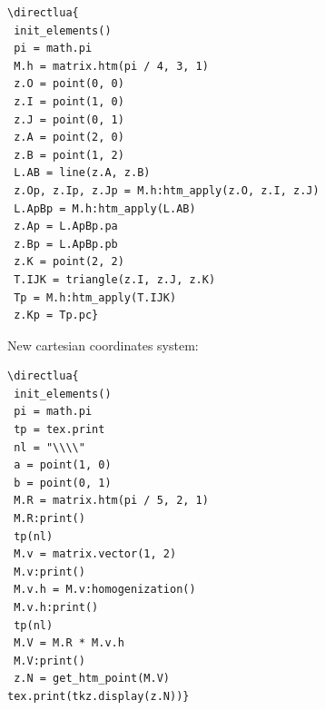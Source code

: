 \begin{minipage}{.6\textwidth}
\begin{verbatim}
\directlua{
 init_elements()
 pi = math.pi
 M.h = matrix.htm(pi / 4, 3, 1)
 z.O = point(0, 0)
 z.I = point(1, 0)
 z.J = point(0, 1)
 z.A = point(2, 0)
 z.B = point(1, 2)
 L.AB = line(z.A, z.B)
 z.Op, z.Ip, z.Jp = M.h:htm_apply(z.O, z.I, z.J)
 L.ApBp = M.h:htm_apply(L.AB)
 z.Ap = L.ApBp.pa
 z.Bp = L.ApBp.pb
 z.K = point(2, 2)
 T.IJK = triangle(z.I, z.J, z.K)
 Tp = M.h:htm_apply(T.IJK)
 z.Kp = Tp.pc}
\end{verbatim}
\end{minipage}
\begin{minipage}{.4\textwidth}
\end{minipage}

\vspace{.5 em}

New  cartesian coordinates system:

\vspace{.5 em}
\begin{minipage}{.5\textwidth}
\begin{verbatim}
\directlua{
 init_elements()
 pi = math.pi
 tp = tex.print
 nl = "\\\\"
 a = point(1, 0)
 b = point(0, 1)
 M.R = matrix.htm(pi / 5, 2, 1)
 M.R:print()
 tp(nl)
 M.v = matrix.vector(1, 2)
 M.v:print()
 M.v.h = M.v:homogenization()
 M.v.h:print()
 tp(nl)
 M.V = M.R * M.v.h
 M.V:print()
 z.N = get_htm_point(M.V)
tex.print(tkz.display(z.N))}
\end{verbatim}
\end{minipage}
\begin{minipage}{.5\textwidth}
\end{minipage}

